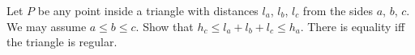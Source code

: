 Let $P$ be any point inside a triangle with distances $l_a$, $l_b$, $l_c$ from the sides $a$, $b$, $c$. We may assume $a \leq b \leq c$. Show that $h_c \leq l_a + l_b + l_c \leq h_a$. There is equality iff the triangle is regular.
